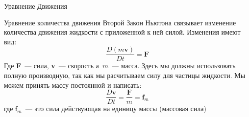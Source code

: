 \begin{chapter}{Уравнение Движения}
\begin{section}{Уравнение количества движения}
Второй Закон Ньютона связывает изменение количества движения жидкости
с приложенной к ней силой. Изменения имеют вид:
\begin{equation}
\frac{D(m\textbf{v})}{Dt} = \textbf{F}
\end{equation}
Где \textbf{F}~--- сила, \textbf{v}~--- скорость а~$m$~---
масса. Здесь мы должны использовать полную производную, так как мы
расчитываем силу для частицы жидкости. Мы можем принять массу
постоянной и написать:
\begin{equation}
\frac{D\textbf{v}}{Dt} = \frac{\textbf{F}}{m} = \textbf{f$_m$}
\end{equation}
где f$_m$~--- это сила действующая на единицу массы (массовая сила)
%


\end{section}
\end{chapter}
